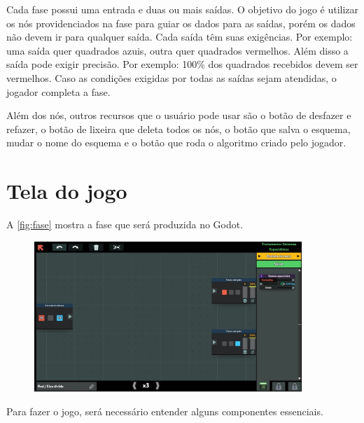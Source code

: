 \documentclass[12pt,oneside,a4paper,chapter=TITLE,section=TITLE,sumario
=tradicional]{abntex2}
\begin{document}
Cada fase possui uma entrada e duas ou mais saídas. O objetivo do jogo é utilizar os nós providenciados na fase para guiar os dados para as saídas, porém os dados não devem ir para qualquer saída. Cada saída têm suas exigências. Por exemplo: uma saída quer quadrados azuis, outra quer quadrados vermelhos. Além disso a saída pode exigir precisão. Por exemplo: 100\% dos quadrados recebidos devem ser vermelhos. Caso as condições exigidas por todas as saídas sejam atendidas, o jogador completa a fase.

Além dos nós, outros recursos que o usuário pode usar são o botão de desfazer e refazer, o botão de lixeira que deleta todos os nós, o botão que salva o esquema, mudar o nome do esquema e o botão que roda o algoritmo criado pelo jogador.

\chapter{Tela do jogo}
\label{cap:tela-do-jogo}

A \autoref{fig:fase} mostra a fase que será produzida no Godot.

\vspace{1em}

\begin{figure}[!h]
    \centering
    \includegraphics[width=0.9\textwidth]{fase}
\end{figure}

\newpage

Para fazer o jogo, será necessário entender alguns componentes essenciais.

\vspace{1em}
\end{document}
